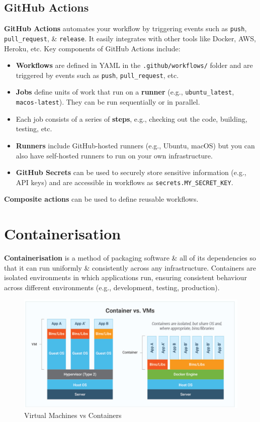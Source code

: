 \documentclass[a4paper,11pt]{article}
\begin{document}
\subsection{GitHub Actions}
\textbf{GitHub Actions} automates your workflow by triggering events such as \verb|push|, \verb|pull_request|, \&
\verb|release|.
It easily integrates with other tools like Docker, AWS, Heroku, etc.
Key components of GitHub Actions include:
\begin{itemize}
    \item   \textbf{Workflows} are defined in YAML in the \verb|.github/workflows/| folder and are triggered by events such 
            as \verb|push|, \verb|pull_request|, etc.
    \item   \textbf{Jobs} define units of work that run on a \textbf{runner} (e.g., \verb|ubuntu_latest|,
            \verb|macos-latest|).
            They can be run sequentially or in parallel.
    \item   Each job consists of a series of \textbf{steps}, e.g., checking out the code, building, testing, etc.
    \item   \textbf{Runners} include GitHub-hosted runners (e.g., Ubuntu, macOS) but you can also have self-hosted runners 
            to run on your own infrastructure.
    \item   \textbf{GitHub Secrets} can be used to securely store sensitive information (e.g., API keys) and are accessible 
            in workflows as \texttt{secrets.MY_SECRET_KEY}.
\end{itemize}

\textbf{Composite actions} can be used to define reusable workflows.

\section{Containerisation}
\textbf{Containerisation} is a method of packaging software \& all of its dependencies so that it can run
uniformly \& consistently across any infrastructure.
Containers are isolated environments in which applications run, ensuring consistent behaviour across different
environments (e.g., development, testing, production).

\begin{figure}[H]
    \centering \includegraphics[width=\textwidth]{images/containers_vs_vms.png}
    \caption{Virtual Machines vs Containers }
\end{figure}
\end{document}
